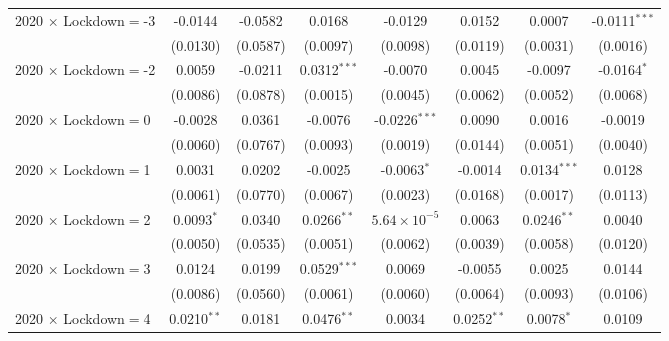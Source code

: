 \begin{tabular}{lccccccc}
   2020 $\times$ Lockdown$=$-3                 & -0.0144         & -0.0582       & 0.0168         & -0.0129               & 0.0152          & 0.0007         & -0.0111$^{***}$\\
                                                & (0.0130)        & (0.0587)      & (0.0097)       & (0.0098)              & (0.0119)        & (0.0031)       & (0.0016)\\
   2020 $\times$ Lockdown$=$-2                 & 0.0059          & -0.0211       & 0.0312$^{***}$ & -0.0070               & 0.0045          & -0.0097        & -0.0164$^{*}$\\
                                                & (0.0086)        & (0.0878)      & (0.0015)       & (0.0045)              & (0.0062)        & (0.0052)       & (0.0068)\\
   2020 $\times$ Lockdown$=$0                  & -0.0028         & 0.0361        & -0.0076        & -0.0226$^{***}$       & 0.0090          & 0.0016         & -0.0019\\
                                                & (0.0060)        & (0.0767)      & (0.0093)       & (0.0019)              & (0.0144)        & (0.0051)       & (0.0040)\\
   2020 $\times$ Lockdown$=$1                  & 0.0031          & 0.0202        & -0.0025        & -0.0063$^{*}$         & -0.0014         & 0.0134$^{***}$ & 0.0128\\
                                                & (0.0061)        & (0.0770)      & (0.0067)       & (0.0023)              & (0.0168)        & (0.0017)       & (0.0113)\\
   2020 $\times$ Lockdown$=$2                  & 0.0093$^{*}$    & 0.0340        & 0.0266$^{**}$  & $5.64\times 10^{-5}$ & 0.0063          & 0.0246$^{**}$  & 0.0040\\
                                                & (0.0050)        & (0.0535)      & (0.0051)       & (0.0062)              & (0.0039)        & (0.0058)       & (0.0120)\\
   2020 $\times$ Lockdown$=$3                  & 0.0124          & 0.0199        & 0.0529$^{***}$ & 0.0069                & -0.0055         & 0.0025         & 0.0144\\
                                                & (0.0086)        & (0.0560)      & (0.0061)       & (0.0060)              & (0.0064)        & (0.0093)       & (0.0106)\\
   2020 $\times$ Lockdown$=$4                  & 0.0210$^{**}$   & 0.0181        & 0.0476$^{**}$  & 0.0034                & 0.0252$^{**}$   & 0.0078$^{*}$   & 0.0109\\

\end{tabular}
